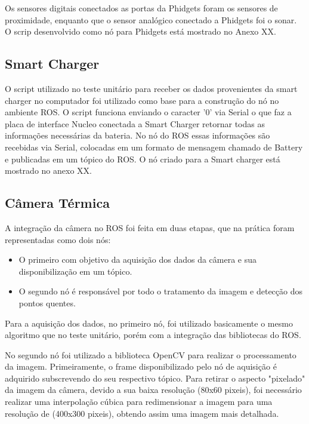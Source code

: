      Os sensores digitais conectados as portas da Phidgets foram os sensores de proximidade, enquanto que o sensor analógico conectado a Phidgets foi o sonar. O scrip desenvolvido como nó para  Phidgets está mostrado no Anexo XX.
     
     \subsection{Smart Charger}
     
     O script utilizado no teste unitário para receber os dados provenientes da smart charger no computador foi utilizado como base para a construção do nó no ambiente ROS. O script funciona enviando o caracter '0' via Serial o que faz a placa de interface Nucleo conectada a Smart Charger retornar todas as informações necessárias da bateria. No nó do ROS essas informações são recebidas via Serial, colocadas em um formato de mensagem chamado de Battery e publicadas em um tópico do ROS. O nó criado para a Smart charger está mostrado no anexo XX.
     
     \subsection{Câmera Térmica}
     
     A integração da câmera no ROS foi feita em duas etapas, que na prática foram representadas como dois nós:
     
     \begin{itemize}
         \item O primeiro com objetivo da aquisição dos dados da câmera e sua disponibilização em um tópico.
         \item O segundo nó é responsável por todo o tratamento da imagem e detecção dos pontos quentes.
     \end{itemize}
     
     Para a aquisição dos dados, no primeiro nó, foi utilizado basicamente o mesmo algoritmo que no teste unitário, porém com a integração das bibliotecas do ROS.
     
     No segundo nó foi utilizado a biblioteca OpenCV para realizar o processamento da imagem. Primeiramente, o frame disponibilizado pelo nó de aquisição é adquirido subscrevendo do seu respectivo tópico. Para retirar o aspecto "pixelado" da imagem da câmera, devido a sua baixa resolução (80x60 pixeis), foi necessário realizar uma interpolação cúbica para redimensionar a imagem para uma resolução de (400x300 pixeis), obtendo assim uma imagem mais detalhada. 
     
